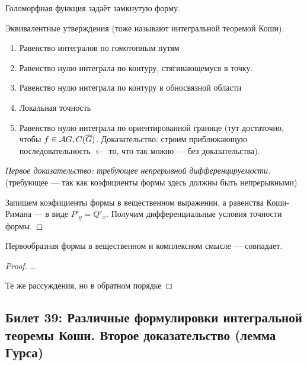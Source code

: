\documentclass[12pt, a4paper, oneside]{memoir}
\begin{document}
\begin{theorem}
     Голоморфная функция задаёт замкнутую форму.
\end{theorem}

Эквивалентные утверждения (тоже называют интегральной теоремой Коши):

\begin{enumerate}
    \item Равенство интегралов по гомотопным путям
    \item Равенство нулю интеграла по контуру, стягивающемуся в точку.
    \item Равенство нулю интеграла по контуру в обносвязной области
    \item Локальная точность
    \item Равенство нулю интеграла по ориентированной границе (тут достаточно, чтобы $f \in {\mathcal{A}}{G}, C(\overline{G})$. Доказательство: строим приближающую последовательность $←$ то, что так можно — без доказательства).
\end{enumerate}

\begin{proof}
    [Первое доказательство: требующее непрерывной дифференцируемости]

    (требующее — так как коэфициенты формы здесь должны быть непрерывными)

    Запишем коэфициенты формы в вещественном выражении, а равенства Коши-Римана — в виде $P'_y = Q'_x$.
    Получим дифференциальные условия точности формы.
\end{proof}

\begin{remark}
    Первообразная формы в вещественном и комплексном смысле — совпадает.

    \begin{proof}
        \leftimp …

        \rightimp Те же рассуждения, но в обратном порядке
    \end{proof}
\end{remark}

\subsection{Билет 39: Различные формулировки интегральной теоремы Коши. Второе доказательство (лемма Гурса)}
\end{document}

